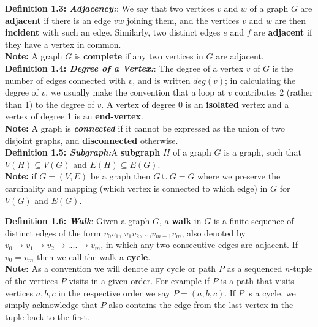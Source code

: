 \documentclass[17pt]{article}
\begin{document}
\textbf{Definition 1.3: \textit{Adjacency:}}: We say that two vertices $v$ and $w$ of a graph $G$ are \textbf{adjacent} if there is an edge $vw$ joining
them, and the vertices $v$ and $w$ are then \textbf{incident} with such an edge. Similarly, two
distinct edges $e$ and $f$ are \textbf{adjacent} if they have a vertex in common.\\

\textbf{Note:} A graph $G$ is \textbf{complete} if any two vertices in $G$ are adjacent.\\

\textbf{Definition 1.4: \textit{Degree of a Vertex:}}: The degree of a vertex $v$ of $G$ is the number of edges connected with $v$, and is written
$deg(v)$; in calculating the degree of $v$, we usually make the convention that a loop at $v$
contributes 2 (rather than 1) to the degree of $v$. A vertex of degree 0 is an \textbf{isolated} vertex and a vertex of degree 1 is an \textbf{end-vertex}.\\

\textbf{Note:} A graph is \textit{\textbf{connected}} if it cannot be expressed as the union of two disjoint graphs, and \textbf{disconnected} otherwise. \\

\textbf{Definition 1.5: \textit{Subgraph:}}A \textbf{subgraph} $H$ of a graph $G$ is a graph, such that $V(H) \subseteq V(G)$ and $E(H) \subseteq E(G)$.\\

\textbf{Note:} if $G=(V,E)$ be a graph then $G \cup G = G$ where we preserve the cardinality and mapping (which vertex is connected to which edge) in $G$ for $V(G)$ and $E(G)$.

\textbf{Definition 1.6: \textit{Walk}}: Given a graph $G$, a \textbf{walk} in $G$ is a finite sequence of distinct edges of the form $v_0v_1$, $v_1v_2$,...,$v_{m-1}v_m$, also denoted by $v_0 \rightarrow v_1 \rightarrow v_2 \rightarrow ....\rightarrow v_m$, in which any two consecutive edges are adjacent.  If $v_0 = v_m$ then we call the walk a \textbf{cycle}.\\
 \textbf{Note:} As a convention we will denote any cycle or path $P$ as a sequenced $n$-tuple of the vertices $P$ visits in a given order. For example if $P$ is a path that visits vertices $a,b,c$ in the respective order we say $P = (a,b,c)$. If $P$ is a cycle, we simply acknowledge that $P$ also contains the edge from the last vertex in the tuple back to the first.\newline
\end{document}
